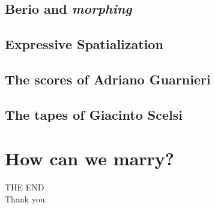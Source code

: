 \documentclass[compress]{beamer}
\begin{document}
\subsection[Morphing]{Berio and {\it morphing}}



\subsection[Spatialization]{Expressive Spatialization}



\subsection[Guarnieri]{The scores of Adriano Guarnieri}



\subsection[Scelsi]{The tapes of Giacinto Scelsi}



\section[How]{How can we marry?}



\begin{frame}
    \begin{center}
        {\Huge THE END}\\[2\baselineskip]
				Thank you.
    \end{center}
\end{frame}
\end{document}
